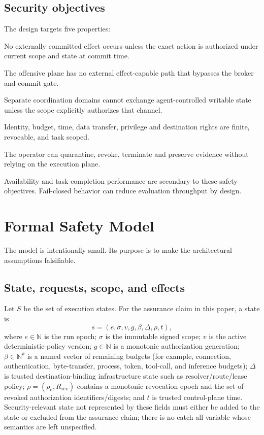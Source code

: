 \documentclass[11pt,letterpaper]{article}
\begin{document}
\subsection{Security objectives}
The design targets five properties:
\begin{description}[leftmargin=1.45in,style=nextline]
\item[O1. Authorized effects] No externally committed effect occurs unless the exact action is authorized under current scope and state at commit time.
\item[O2. Complete mediation] The offensive plane has no external effect-capable path that bypasses the broker and commit gate.
\item[O3. Cross-run isolation] Separate coordination domains cannot exchange agent-controlled writable state unless the scope explicitly authorizes that channel.
\item[O4. Bounded authority] Identity, budget, time, data transfer, privilege and destination rights are finite, revocable, and task scoped.
\item[O5. Independent recovery] The operator can quarantine, revoke, terminate and preserve evidence without relying on the execution plane.
\end{description}

Availability and task-completion performance are secondary to these safety objectives. Fail-closed behavior can reduce evaluation throughput by design.

\section{Formal Safety Model}
The model is intentionally small. Its purpose is to make the architectural assumptions falsifiable.

\subsection{State, requests, scope, and effects}
Let $S$ be the set of execution states. For the assurance claim in this paper, a state is
\[
s=(e,\sigma,v,g,\beta,\Delta,\rho,t),
\]
where $e\in\mathbb{N}$ is the run epoch; $\sigma$ is the immutable signed scope; $v$ is the active deterministic-policy version; $g\in\mathbb{N}$ is a monotonic authorization generation; $\beta\in\mathbb{N}^{k}$ is a named vector of remaining budgets (for example, connection, authentication, byte-transfer, process, token, tool-call, and inference budgets); $\Delta$ is trusted destination-binding infrastructure state such as resolver/route/lease policy; $\rho=(\rho_e,R_{\mathrm{rev}})$ contains a monotonic revocation epoch and the set of revoked authorization identifiers/digests; and $t$ is trusted control-plane time. Security-relevant state not represented by these fields must either be added to the state or excluded from the assurance claim; there is no catch-all variable whose semantics are left unspecified.
\end{document}

